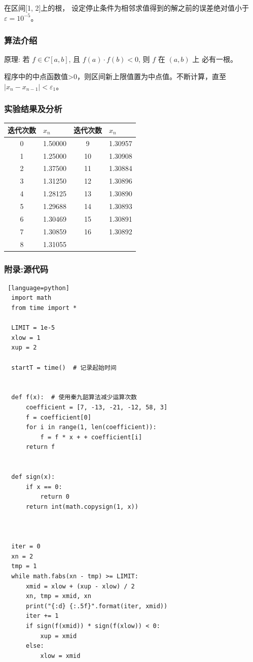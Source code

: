 \documentclass[UTF8]{ctexart}
\begin{document}
在区间[1, 2]上的根， 设定停止条件为相邻求值得到的解之前的误差绝对值小于$\varepsilon=10^{-5}$。
\subsubsection{算法介绍}
原理: 若 $f \in C[a, b]$, 且 $f(a) \cdot f(b)<0$, 则 $f$ 在 $(a, b)$ 上 必有一根。

程序中的中点函数值>0，则区间新上限值置为中点值。不断计算，直至$\left|x_{n}-x_{n-1}\right|<\varepsilon_{1}$。
\subsubsection{实验结果及分析}
\begin{table}[H]
  \vspace{0pt}
  \centering
  \begin{tabular}{clcl}
      \hline
      迭代次数 & $x_n$ & 迭代次数 & $x_n$\\
      \hline
      0 & 1.50000 & 9 & 1.30957\\
      1 & 1.25000 & 10& 1.30908\\
      2 & 1.37500 & 11 & 1.30884\\
      3 & 1.31250 & 12 & 1.30896\\
      4 & 1.28125 & 13 & 1.30890\\
      5 & 1.29688 & 14 & 1.30893\\
      6 & 1.30469 & 15 & 1.30891\\
      7 & 1.30859 & 16 & 1.30892\\
      8 & 1.31055 &\\
      \hline       
  \end{tabular}
\end{table}

\subsubsection{附录:源代码}
\begin{lstlisting} [language=python]
  import math
  from time import *
  
  LIMIT = 1e-5
  xlow = 1
  xup = 2
  
  startT = time()  # 记录起始时间
  
  
  def f(x):  # 使用秦九韶算法减少运算次数
      coefficient = [7, -13, -21, -12, 58, 3]
      f = coefficient[0]
      for i in range(1, len(coefficient)):
          f = f * x + + coefficient[i]
      return f
  
  
  def sign(x):
      if x == 0:
          return 0
      return int(math.copysign(1, x))
  
  
  
  iter = 0
  xn = 2
  tmp = 1
  while math.fabs(xn - tmp) >= LIMIT:
      xmid = xlow + (xup - xlow) / 2
      xn, tmp = xmid, xn
      print("{:d} {:.5f}".format(iter, xmid))
      iter += 1
      if sign(f(xmid)) * sign(f(xlow)) < 0:
          xup = xmid
      else:
          xlow = xmid
\end{lstlisting}
\end{document}
